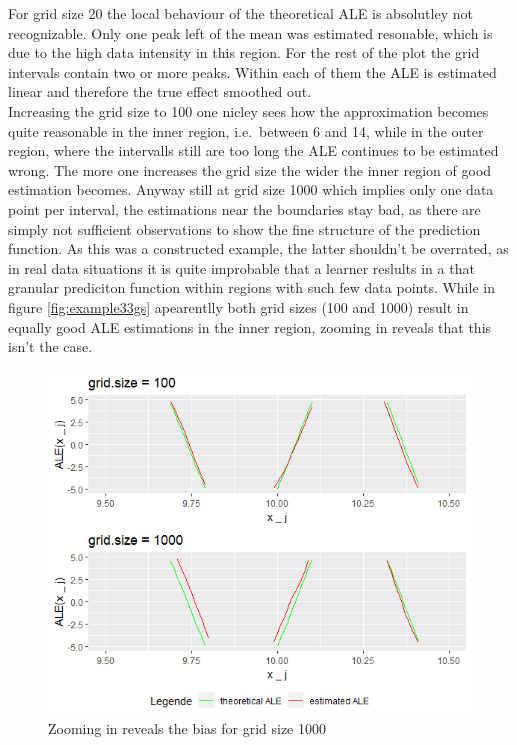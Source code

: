 \documentclass[
]{krantz}
\begin{document}
For grid size 20 the local behaviour of the theoretical ALE is absolutley not recognizable. Only one peak left of the mean was estimated resonable, which is due to the high data intensity in this region. For the rest of the plot the grid intervals contain two or more peaks. Within each of them the ALE is estimated linear and therefore the true effect smoothed out.\\
Increasing the grid size to 100 one nicley sees how the approximation becomes quite reasonable in the inner region, i.e.~between 6 and 14, while in the outer region, where the intervalls still are too long the ALE continues to be estimated wrong.
The more one increases the grid size the wider the inner region of good estimation becomes. Anyway still at grid size 1000 which implies only one data point per interval, the estimations near the boundaries stay bad, as there are simply not sufficient observations to show the fine structure of the prediction function. As this was a constructed example, the latter shouldn't be overrated, as in real data situations it is quite improbable that a learner reslults in a that granular prediciton function within regions with such few data points.
While in figure \ref{fig:example33gs} apearentlly both grid sizes (100 and 1000) result in equally good ALE estimations in the inner region, zooming in reveals that this isn't the case.

\begin{figure}
\includegraphics[width=1\linewidth]{images/ALE_2_example3_zoom_} \caption{Zooming in reveals the bias for grid size 1000}\label{fig:example3zoom}
\end{figure}
\end{document}
